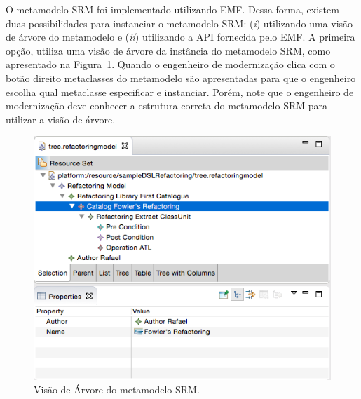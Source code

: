 O metamodelo SRM foi implementado utilizando EMF. Dessa forma, existem duas possibilidades para instanciar o metamodelo SRM: (\textit{i}) utilizando uma visão de árvore do metamodelo e (\textit{ii}) utilizando a API fornecida pelo EMF. A primeira opção, utiliza uma visão de árvore da instância do metamodelo SRM, como apresentado na Figura~\ref{fig:visao_arvore_metamodelo_srm}. Quando o engenheiro de modernização clica com o botão direito metaclasses do metamodelo são apresentadas para que o engenheiro escolha qual metaclasse especificar e instanciar. Porém, note que o engenheiro de modernização deve conhecer a estrutura correta do metamodelo SRM para utilizar a visão de árvore. 

\begin{figure}[h]
	\centering
	\caption{Visão de Árvore do metamodelo SRM.}
	\label{fig:visao_arvore_metamodelo_srm}
	\includegraphics[scale=0.65]{images/tree_srm}
	\fautor
\end{figure}

